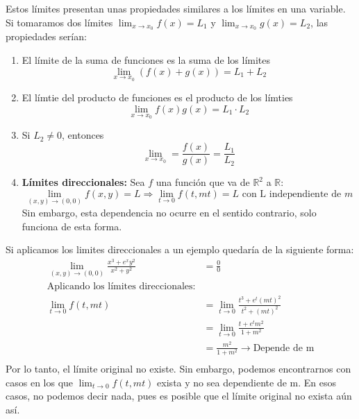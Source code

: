 \documentclass[11pt]{article}
\newcommand{\R}{\mathbb{R}}
\theoremstyle{plain}
\begin{document}
            Estos límites presentan unas propiedades similares a los límites en una variable. Si tomaramos dos límites $\lim_{x\to x_0} f(x) = L_1$ y $\lim_{x\to x_0} g(x) = L_2$, las propiedades serían:
            \begin{enumerate}[label = \Alph*]
                \item El límite de la suma de funciones es la suma de los límites \[\lim_{x\to x_0} (f(x)+g(x)) = L_1 + L_2\]
                \item El límtie del producto de funciones es el producto de los límties \[\lim_{x\to x_0} f(x)g(x) = L_1 \cdot L_2\]
                \item Si $L_2 \ne 0$, entonces \[\lim_{x\to x_0} = \frac{f(x)}{g(x)} = \frac{L_1}{L_2}\]
                \item \textbf{Límites direccionales:} Sea $f$ una función que va de $\R^2$ a $\R$: \[\lim_{(x,y) \to (0,0)} f(x,y) = L \Rightarrow \lim_{t \to 0} f(t,mt) = L \text{ con L independiente de $m$}\]
                Sin embargo, esta dependencia no ocurre en el sentido contrario, solo funciona de esta forma. 
            \end{enumerate}
            Si aplicamos los limites direccionales a un ejemplo quedaría de la siguiente forma:
            \begin{equation}
                \begin{aligned}
                    \lim_{(x,y) \to (0,0)} \frac{x^3 + e^x y^2}{x^2 + y^2} & = \frac{0}{0}\\
                    \text{Aplicando los límites direccionales:}\\
                    \lim_{t\to 0} f(t,mt) & = \lim_{t \to 0} \frac{t^3+e^t(mt)^2}{t^2 + (mt)^2}\\
                    & = \lim_{t \to 0} \frac{t + e^tm^2}{1 + m^2}\\
                    & = \frac{m^2}{1+m^2} \rightarrow \text{Depende de m}\\
                \end{aligned}
            \end{equation}
            Por lo tanto, el límite original no existe. Sin embargo, podemos encontrarnos con casos en los que $\lim_{t\to 0} f(t,mt)$ exista y no sea dependiente de m. En esos casos, no podemos decir nada, pues es posible que el límite original no exista aún así.


\end{document}
